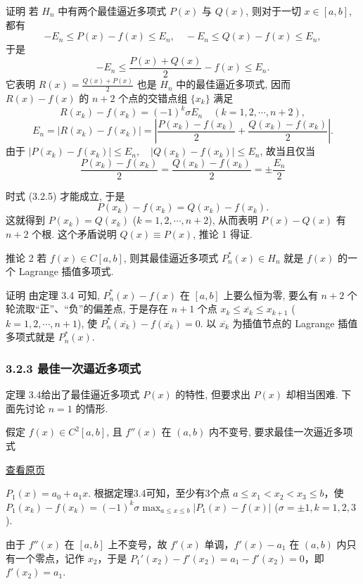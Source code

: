 \documentclass[
  10pt,
  fontset=fandol]{ctexart}
\begin{document}
证明 若 \(H_n\) 中有两个最佳逼近多项式 \(P(x)\) 与 \(Q(x)\), 则对于一切 \(x \in [a,b]\), 都有 \[
-E_n \leqslant P(x)-f(x) \leqslant E_n, \quad -E_n \leqslant Q(x)-f(x) \leqslant E_n,
\] 于是 \[
-E_n \leqslant \frac{P(x)+Q(x)}{2}-f(x) \leqslant E_n.
\] 它表明 \(R(x)=\frac{Q(x)+P(x)}{2}\) 也是 \(H_n\) 中的最佳逼近多项式, 因而 \(R(x)-f(x)\) 的 \(n+2\) 个点的交错点组 \(\{x_k\}\) 满足 \[
R(x_k)-f(x_k)=(-1)^k \sigma E_n \quad (k=1,2,\cdots,n+2),
\] \[
E_n=\left|R(x_k)-f(x_k)\right|=\left|\frac{P(x_k)-f(x_k)}{2}+\frac{Q(x_k)-f(x_k)}{2}\right|. \tag{3.2.5}
\] 由于 \(\left|P(x_k)-f(x_k)\right| \leqslant E_n, \quad \left|Q(x_k)-f(x_k)\right| \leqslant E_n\), 故当且仅当 \[
\frac{P(x_k)-f(x_k)}{2}=\frac{Q(x_k)-f(x_k)}{2}=\pm \frac{E_n}{2}
\]

时式 (3.2.5) 才能成立, 于是 \[
P(x_k)-f(x_k)=Q(x_k)-f(x_k).
\] 这就得到 \(P(x_k)=Q(x_k)\) (\(k=1,2,\cdots,n+2\)), 从而表明 \(P(x)-Q(x)\) 有 \(n+2\) 个根. 这个矛盾说明 \(Q(x) \equiv P(x)\), 推论 1 得证.

推论 2 若 \(f(x) \in C[a,b]\), 则其最佳逼近多项式 \(P_n^*(x) \in H_n\) 就是 \(f(x)\) 的一个 Lagrange 插值多项式.

证明 由定理 3.4 可知, \(P_n^*(x)-f(x)\) 在 \([a,b]\) 上要么恒为零, 要么有 \(n+2\) 个轮流取``正''、``负''的偏差点, 于是存在 \(n+1\) 个点 \(x_k \leqslant \overline{x_k} \leqslant x_{k+1}\) (\(k=1,2,\cdots,n+1\)), 使 \(P_n^*(\overline{x_k})-f(\overline{x_k})=0\). 以 \(\overline{x_k}\) 为插值节点的 Lagrange 插值多项式就是 \(P_n^*(x)\).

\subsubsection{3.2.3 最佳一次逼近多项式}\label{ux6700ux4f73ux4e00ux6b21ux903cux8fd1ux591aux9879ux5f0f}

定理 3.4给出了最佳逼近多项式 \(P(x)\) 的特性, 但要求出 \(P(x)\) 却相当困难. 下面先讨论 \(n=1\) 的情形.

假定 \(f(x) \in C^2[a,b]\), 且 \(f''(x)\) 在 \((a,b)\) 内不变号, 要求最佳一次逼近多项式

\href{../../source-images/pdf-064.jpeg}{查看原页}

\(P_1(x) = a_0 + a_1x\). 根据定理3.4可知，至少有3个点 \(a \leqslant x_1 < x_2 < x_3 \leqslant b\)，使 \(P_1(x_k) - f(x_k) = (-1)^k \sigma \max_{a \leqslant x \leqslant b} |P_1(x) - f(x)|\) (\(\sigma = \pm 1, k = 1, 2, 3\)).

由于 \(f''(x)\) 在 \([a, b]\) 上不变号，故 \(f'(x)\) 单调，\(f'(x) - a_1\) 在 \((a, b)\) 内只有一个零点，记作 \(x_2\)，于是 \(P_1'(x_2) - f'(x_2) = a_1 - f'(x_2) = 0\)，即 \(f'(x_2) = a_1\).
\end{document}
